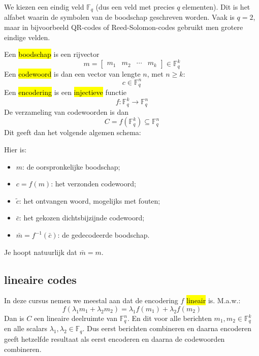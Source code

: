 We kiezen een eindig veld $\mathbb{F}_q$ (dus een veld met precies $q$ elementen). Dit is het alfabet waarin de symbolen van de boodschap geschreven worden. Vaak is $q=2$, maar in bijvoorbeeld QR-codes of Reed-Solomon-codes gebruikt men grotere eindige velden.

Een \hl{boodschap} is een rijvector
\begin{equation*}
    m = \begin{bmatrix}
        m_1 & m_2 & \cdots & m_k
    \end{bmatrix} \in \mathbb{F}_q^k
\end{equation*}
Een \hl{codewoord} is dan een vector van lengte $n$, met $n \ge k$:
\begin{equation*}
    c \in \mathbb{F}_q^n
\end{equation*}
Een \hl{encodering} is een \hl{injectieve} functie
\begin{equation*}
    f : \mathbb{F}_q^k \to \mathbb{F}_q^n
\end{equation*}
De verzameling van codewoorden is dan
\begin{equation*}
    C = f\left(\mathbb{F}_q^k\right) \subseteq \mathbb{F}_q^n
\end{equation*}
Dit geeft dan het volgende algemen schema:

\begin{center}
\resizebox{1.00\textwidth}{!}{%
    
}
\end{center}

Hier is:
\begin{itemize}
    \item $m$: de oorspronkelijke boodschap;
    \item $c = f(m)$: het verzonden codewoord;
    \item $\tilde{c}$: het ontvangen woord, mogelijks met fouten;
    \item $\bar{c}$: het gekozen dichtsbijzijnde codewoord;
    \item $\bar{m} = f^{-1}(\bar{c})$: de gedecodeerde boodschap.
\end{itemize}
Je hoopt natuurlijk dat $\bar{m} = m$.

\subsection{lineaire codes}

In deze cursus nemen we meestal aan dat de encodering $f$ \hl{lineair} is. M.a.w.:
\begin{equation*}
    f(\lambda_1m_1 + \lambda_2m_2) = \lambda_1 f(m_1) + \lambda_2 f(m_2)
\end{equation*}
Dan is $C$ een lineaire deelruimte van $\mathbb{F}_q^n$. En dit voor alle berichten $m_1, m_2 \in \mathbb{F}_q^k$ en alle scalars $\lambda_1, \lambda_2 \in \mathbb{F}_q$. Dus eerst berichten combineren en daarna encoderen geeft hetzelfde resultaat als eerst encoderen en daarna de codewoorden combineren.


